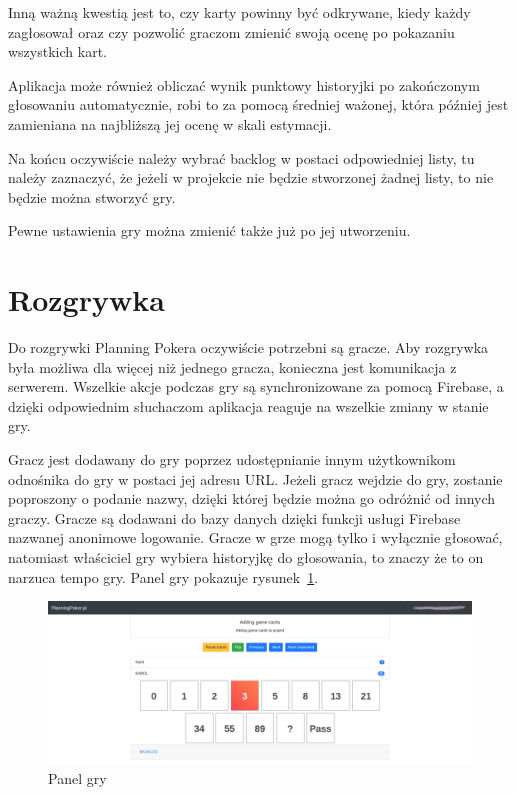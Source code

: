 Inną ważną kwestią jest to, czy karty powinny być odkrywane, kiedy każdy zagłosował
oraz czy pozwolić graczom zmienić swoją ocenę po pokazaniu wszystkich kart.

Aplikacja może również obliczać wynik punktowy historyjki po zakończonym głosowaniu automatycznie,
robi to za pomocą średniej ważonej, która później jest zamieniana na najbliższą jej ocenę w skali estymacji.

Na końcu oczywiście należy wybrać backlog w postaci odpowiedniej listy, tu należy zaznaczyć,
że jeżeli w projekcie nie będzie stworzonej żadnej listy, to nie będzie można stworzyć gry.

Pewne ustawienia gry można zmienić także już po jej utworzeniu.

\section{Rozgrywka}

Do rozgrywki Planning Pokera oczywiście potrzebni są gracze.
Aby rozgrywka była możliwa dla więcej niż jednego gracza, konieczna jest komunikacja z serwerem.
Wszelkie akcje podczas gry są synchronizowane za pomocą Firebase,
a dzięki odpowiednim słuchaczom aplikacja reaguje na wszelkie zmiany w stanie gry.

Gracz jest dodawany do gry poprzez udostępnianie innym użytkownikom odnośnika do gry
w postaci jej adresu URL\@.
Jeżeli gracz wejdzie do gry, zostanie poproszony o podanie nazwy,
dzięki której będzie można go odróżnić od innych graczy.
Gracze są dodawani do bazy danych dzięki funkcji usługi Firebase nazwanej anonimowe logowanie.
Gracze w grze mogą tylko i wyłącznie głosować,
natomiast właściciel gry wybiera historyjkę do głosowania, to znaczy że to on narzuca tempo gry.
Panel gry pokazuje rysunek~\ref{rys:gra}.

\begin{figure}[h]
	\centering\includegraphics[width=\textwidth]{img/gra.png}
	\caption{Panel gry}\label{rys:gra}%
\end{figure}

